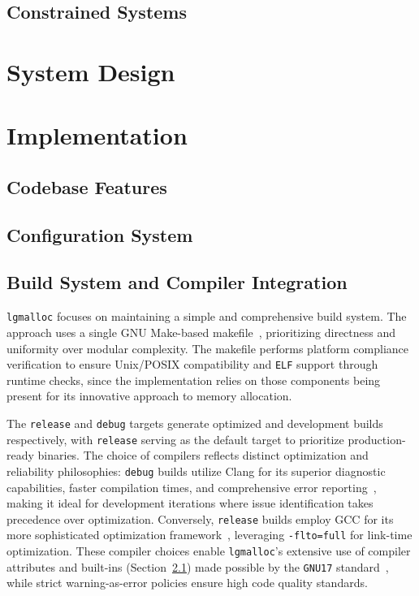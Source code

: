 \documentclass[sigconf,authordraft]{acmart}
\begin{document}
\subsection{Constrained Systems}

\section{System Design}
\label{sec:design}

\section{Implementation}
\label{sec:implementation}

\subsection{Codebase Features}
\label{sec:features}

\subsection{Configuration System}

\subsection{Build System and Compiler Integration}

\texttt{lgmalloc} focuses on maintaining a simple and comprehensive build system.
The approach uses a single GNU Make-based makefile~\cite{stallman2020make},
prioritizing directness and uniformity over modular complexity. The makefile performs
platform compliance verification to ensure Unix/POSIX compatibility and \texttt{ELF}
support through runtime checks, since the implementation relies on those components
being present for its innovative approach to memory allocation.

The \texttt{release} and \texttt{debug} targets generate optimized and development
builds respectively, with \texttt{release} serving as the default target to
prioritize production-ready binaries. The choice of compilers reflects distinct
optimization and reliability philosophies: \texttt{debug} builds utilize Clang for
its superior diagnostic capabilities, faster compilation times, and comprehensive error
reporting~\cite{clang_diagnostics,lattner2004llvm}, making it ideal for development
iterations where issue identification takes precedence over optimization. Conversely,
\texttt{release} builds employ GCC for its more sophisticated optimization
framework~\cite{colfax2017compiler}, leveraging \texttt{-flto=full} for link-time
optimization. These compiler choices enable \texttt{lgmalloc}'s extensive use of
compiler attributes and built-ins (Section~\ref{sec:features}) made possible by
the \texttt{GNU17} standard~\cite{iso2018c17}, while strict warning-as-error
policies ensure high code quality standards.
\end{document}
